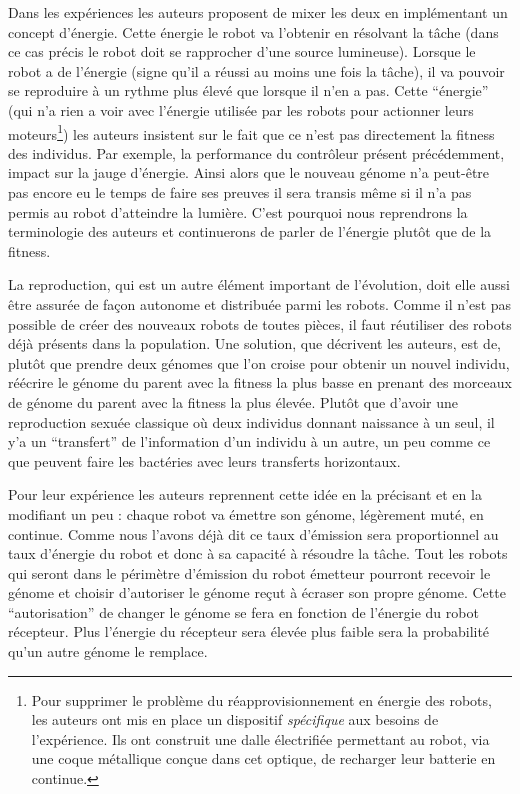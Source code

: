Dans les expériences les auteurs proposent de mixer les deux en implémentant un concept d'énergie. Cette énergie le robot va l'obtenir en résolvant la tâche (dans ce cas précis le robot doit se rapprocher d'une source lumineuse). Lorsque le robot a de l'énergie (signe qu'il a réussi au moins une fois la tâche), il va pouvoir se reproduire à un rythme plus élevé que lorsque il n'en a pas. Cette ``énergie'' (qui n'a rien a voir avec l'énergie utilisée par les robots pour actionner leurs moteurs\footnote{Pour supprimer le problème du réapprovisionnement en énergie des robots, les auteurs ont mis en place un dispositif \emph{spécifique} aux besoins de l'expérience. Ils ont construit une dalle électrifiée permettant au robot, via une coque métallique conçue dans cet optique, de recharger leur batterie en continue.}) les auteurs insistent sur le fait que ce n'est pas directement la fitness des individus. Par exemple, la performance du contrôleur présent précédemment, impact sur la jauge d'énergie. Ainsi alors que le nouveau génome n'a peut-être pas encore eu le temps de faire ses preuves il sera transis même si il n'a pas permis au robot d'atteindre la lumière. C'est pourquoi nous reprendrons la terminologie des auteurs et continuerons de parler de l'énergie plutôt que de la fitness.

La reproduction, qui est un autre élément important de l'évolution, doit elle aussi être assurée de façon autonome et distribuée parmi les robots. Comme il n'est pas possible de créer des nouveaux robots de toutes pièces, il faut réutiliser des robots déjà présents dans la population. Une solution, que décrivent les auteurs, est de, plutôt que prendre deux génomes que l'on croise pour obtenir un nouvel individu, réécrire le génome du parent avec la fitness la plus basse en prenant des morceaux de génome du parent avec la fitness la plus élevée. Plutôt que d'avoir une reproduction sexuée classique où deux individus donnant naissance à un seul, il y'a un ``transfert'' de l'information d'un individu à un autre, un peu comme ce que peuvent faire les bactéries avec leurs transferts horizontaux. 

Pour leur expérience les auteurs reprennent cette idée en la précisant et en la modifiant un peu : chaque robot va émettre son génome, légèrement muté, en continue. Comme nous l'avons déjà dit ce taux d'émission sera proportionnel au taux d'énergie du robot et donc à sa capacité à résoudre la tâche. Tout les robots qui seront dans le périmètre d'émission du robot émetteur pourront recevoir le génome et choisir d'autoriser le génome reçut à écraser son propre génome. Cette ``autorisation'' de changer le génome se fera en fonction de l'énergie du robot récepteur. Plus l'énergie du récepteur sera élevée plus faible sera la probabilité qu'un autre génome le remplace.

